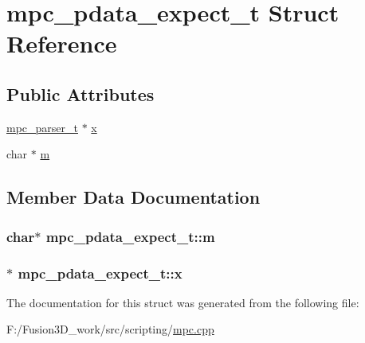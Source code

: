 \hypertarget{structmpc__pdata__expect__t}{}\section{mpc\+\_\+pdata\+\_\+expect\+\_\+t Struct Reference}
\label{structmpc__pdata__expect__t}
\subsection*{Public Attributes}
\begin{DoxyCompactItemize}
\item 
\hyperlink{structmpc__parser__t}{mpc\+\_\+parser\+\_\+t} $\ast$ \hyperlink{structmpc__pdata__expect__t_a25c53db2883cd57f5b504da4f8750aeb}{x}
\item 
char $\ast$ \hyperlink{structmpc__pdata__expect__t_a4eeb33efecf3ec9ac7e92c356e24f894}{m}
\end{DoxyCompactItemize}


\subsection{Member Data Documentation}
\hypertarget{structmpc__pdata__expect__t_a4eeb33efecf3ec9ac7e92c356e24f894}{}
\subsubsection[{m}]{\setlength{\rightskip}{0pt plus 5cm}char$\ast$ mpc\+\_\+pdata\+\_\+expect\+\_\+t\+::m}\label{structmpc__pdata__expect__t_a4eeb33efecf3ec9ac7e92c356e24f894}
\hypertarget{structmpc__pdata__expect__t_a25c53db2883cd57f5b504da4f8750aeb}{}
\subsubsection[{x}]{$\ast$ mpc\+\_\+pdata\+\_\+expect\+\_\+t\+::x}\label{structmpc__pdata__expect__t_a25c53db2883cd57f5b504da4f8750aeb}


The documentation for this struct was generated from the following file\+:\begin{DoxyCompactItemize}
\item 
F\+:/\+Fusion3\+D\+\_\+work/src/scripting/\hyperlink{mpc_8cpp}{mpc.\+cpp}\end{DoxyCompactItemize}
